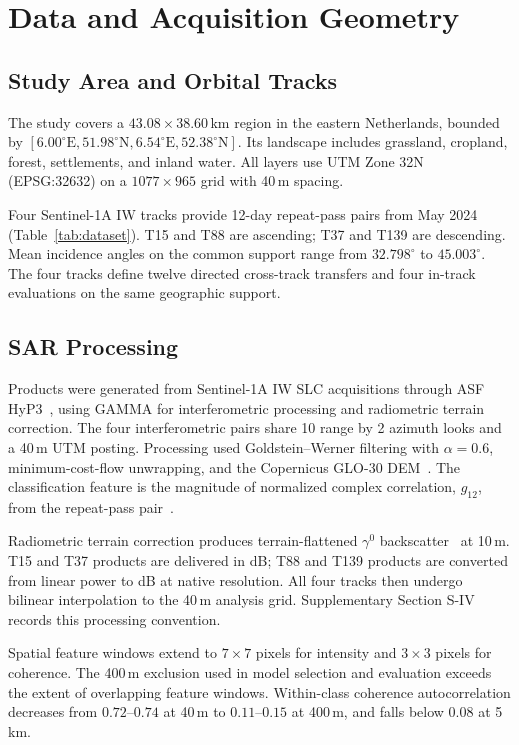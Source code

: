 \section{Data and Acquisition Geometry}
\subsection{Study Area and Orbital Tracks}
The study covers a $43.08\times38.60$\,km region in the eastern Netherlands, bounded by $[6.00^\circ\mathrm{E},51.98^\circ\mathrm{N},6.54^\circ\mathrm{E},52.38^\circ\mathrm{N}]$. Its landscape includes grassland, cropland, forest, settlements, and inland water. All layers use UTM Zone 32N (EPSG:32632) on a $1077\times965$ grid with 40\,m spacing.

Four Sentinel-1A IW tracks provide 12-day repeat-pass pairs from May 2024 (Table~\ref{tab:dataset}). T15 and T88 are ascending; T37 and T139 are descending. Mean incidence angles on the common support range from $32.798^\circ$ to $45.003^\circ$. The four tracks define twelve directed cross-track transfers and four in-track evaluations on the same geographic support.

\subsection{SAR Processing}
\label{sec:chain}
Products were generated from Sentinel-1A IW SLC acquisitions through ASF HyP3~\cite{HyP3}, using GAMMA for interferometric processing and radiometric terrain correction. The four interferometric pairs share 10 range by 2 azimuth looks and a 40\,m UTM posting. Processing used Goldstein--Werner filtering with $\alpha=0.6$, minimum-cost-flow unwrapping, and the Copernicus GLO-30 DEM~\cite{CopernicusDEM}. The classification feature is the magnitude of normalized complex correlation, $g_{12}$, from the repeat-pass pair~\cite{Touzi1999}.

Radiometric terrain correction produces terrain-flattened $\gamma^0$ backscatter~\cite{Small2011} at 10\,m. T15 and T37 products are delivered in dB; T88 and T139 products are converted from linear power to dB at native resolution. All four tracks then undergo bilinear interpolation to the 40\,m analysis grid. Supplementary Section S-IV records this processing convention.

Spatial feature windows extend to $7\times7$ pixels for intensity and $3\times3$ pixels for coherence. The 400\,m exclusion used in model selection and evaluation exceeds the extent of overlapping feature windows. Within-class coherence autocorrelation decreases from $0.72$--$0.74$ at 40\,m to $0.11$--$0.15$ at 400\,m, and falls below $0.08$ at 5\,km.

